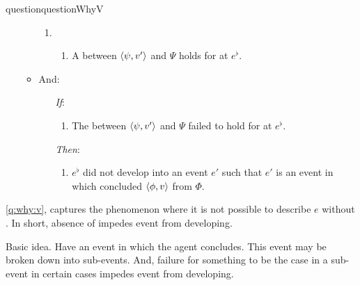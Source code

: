 \begin{note}
\begin{restatable}[\qWhyV{}]{question}{questionWhyV}
\begin{itemize}
\begin{itemize}
        \begin{enumerate}[label=]
        \item
          \begin{enumerate}[label=\alph*., ref=(\alph*), series=qWhyVdef]
          \item
            \label{q:why:v:a}
            A  between \(\langle \psi, v' \rangle\) and \(\Psi\) holds for \vAgent{} at \(e^{\flat}\).
          \end{enumerate}
        \end{enumerate}
      \item
        And:
        \begin{enumerate}
        \item[\emph{If}:]
          \begin{enumerate}[label=\alph*., ref=(\alph*), resume*=qWhyVdef]
          \item
            \label{q:why:v:if}
            The  between \(\langle \psi, v' \rangle\) and \(\Psi\) failed to hold for \vAgent{} at \(e^{\flat}\).
          \end{enumerate}
        \item[\emph{Then}:]
          \begin{enumerate}[label=\alph*., ref=(\alph*), resume*=qWhyVdef]
          \item
            \label{q:why:v:then}
            \(e^{\flat}\) did not develop into an event \(e'\) such that \(e'\) is an event in which \vAgent{} concluded \(\langle \phi, v \rangle\) from \(\Phi\).
          \end{enumerate}
        \end{enumerate}
      \end{itemize}
    \end{itemize}
    \vspace{-\baselineskip}
  \end{restatable}

  
\end{note}

\begin{note}
  \autoref{q:why:v}, captures the phenomenon where it is not possible to describe \(e\) without \ros{}.
  In short, absence of \ros{} impedes event from developing.

  Basic idea.
  Have an event in which the agent concludes.
  This event may be broken down into sub-events.
  And, failure for something to be the case in a sub-event in certain cases impedes event from developing.
\end{note}


